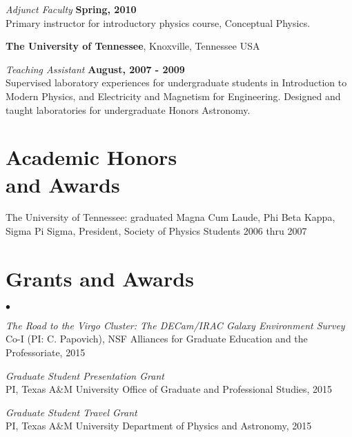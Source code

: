 \documentclass[margin,line, 11pt]{res}
\newenvironment{list2}{
  \begin{list}{$\bullet$}{%
      \setlength{\itemsep}{0in}
      \setlength{\parsep}{0in} \setlength{\parskip}{0in}
      \setlength{\topsep}{0in} \setlength{\partopsep}{0in}
      \setlength{\leftmargin}{0.2in}}}{\end{list}}
\begin{document}
\begin{resume}
\emph{Adjunct Faculty} \hfill \textbf{Spring, 2010}\\
Primary instructor for introductory physics course, Conceptual Physics.

\textbf{The University of Tennessee}, Knoxville, Tennessee USA
\vspace{-3mm}

\emph{Teaching Assistant} \hfill \textbf{August, 2007 - 2009}\\
Supervised laboratory experiences for undergraduate students in Introduction to Modern Physics, and Electricity and Magnetism for Engineering. Designed and taught laboratories for undergraduate Honors Astronomy.
\vspace*{-3mm}

\section{Academic Honors \\and Awards}
The University of Tennessee: graduated Magna Cum Laude, Phi Beta Kappa, Sigma
Pi Sigma, President, Society of Physics Students 2006 thru 2007

\section{Grants and Awards}
\begin{list2}
    \item \emph{The Road to the Virgo Cluster: The DECam/IRAC Galaxy Environment Survey}\\
	Co-I (PI: C. Papovich), NSF Alliances for Graduate Education and the Professoriate, 2015
	\item \emph{Graduate Student Presentation Grant}\\
	PI, Texas A\&M University Office of Graduate and Professional Studies, 2015
	\item \emph{Graduate Student Travel Grant}\\
	PI, Texas A\&M University Department of Physics and Astronomy, 2015
\end{list2}


\end{resume}
\end{document}
